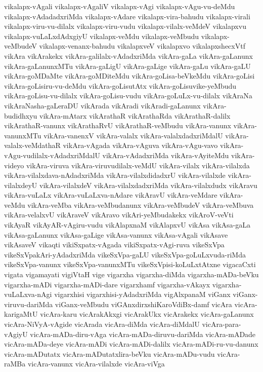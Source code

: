 {vikalapx-vAgali
vikalapx-vAgaliV
vikalapx-vAgi
vikalapx-vAgu-vu-deMdu
vikalapx-vAdadadxriMda
vikalapx-vAdare
vikalapx-vira-bahudu
vikalapx-virali
vikalapx-viru-vu-dilalx
vikalapx-viru-vudu
vikalapx-vilalx-veMdeV
vikalapxvu
vikalapx-vuLaLxdAdxgiyU
vikalapx-veMdu
vikalapx-veMbudu
vikalapx-veMbudeV
vikalapx-venanx-bahudu
vikalapxveV
vikalapxvo
vikalapxshecxVtf
vikAra
vikArakekx
vikAra-galilalx-vAdadxriMda
vikAra-gaLa
vikAra-gaLanunx
vikAra-gaLanunxMTu
vikAra-gaLigU
vikAra-gaLige
vikAra-gaLu
vikAra-gaLU
vikAra-goMDaMte
vikAra-goMDiteMdu
vikAra-goLisa-beVkeMdu
vikAra-goLisi
vikAra-goLisiru-vu-deMdu
vikAra-goLisutAtx
vikAra-goLisuvike-yeMbudu
vikAra-goLisu-vu-dilalx
vikAra-goLisu-vudu
vikAra-goLuLx-vu-dilalx
vikAraNa
vikAraNasha-gaLeraDU
vikArada
vikAradi
vikAradi-gaLanunx
vikAra-budidhxyu
vikAra-mAtarx
vikArathaR
vikArathaRda
vikArathaR-dalilx
vikArathaR-vanunx
vikArathaRvU
vikArathaR-veMbudu
vikAra-vanunx
vikAra-vanunxMTu
vikAra-vanenxV
vikAra-valalx
vikAra-valalxdadxriMdalU
vikAra-valalx-veMdathaR
vikAra-vAgada
vikAra-vAguva
vikAra-vAgu-vavo
vikAra-vAgu-vudilalx-vAdadxriMdalU
vikAra-vAdadxriMda
vikAra-vAyiteMdu
vikAra-videyo
vikAra-viruva
vikAra-viruvudilalx-veMdU
vikAra-vilalx
vikAra-vilalxda
vikAra-vilalxdava-nAdadxriMda
vikAra-vilalxdidadxrU
vikAra-vilalxde
vikAra-vilalxdeyU
vikAra-vilalxdeV
vikAra-vilalxdadxriMda
vikAra-vilalxdudx
vikAravu
vikAra-vuLaLx
vikAra-vuLaLxva-nAdare
vikAravU
vikAra-veMdare
vikAra-veMdu
vikAra-veMba
vikAra-veMbudanunx
vikAra-veMbudeV
vikAra-veMbuva
vikAra-velalxvU
vikAraveV
vikAravo
vikAri-yeMbudakekx
vikAroV-veVti
vikAyaR
vikAyAR-vAgiru-vudu
vikAlapxnaM
vikAlapxvU
vikAsa
vikAsa-gaLa
vikAsa-gaLanunx
vikAsa-gaLige
vikAsa-vanunx
vikAsa-vAgali
vikAsave
vikAsaveV
vikaqti
vikiSxpatx-vAgada
vikiSxpatx-vAgi-ruva
vikeSxVpa
vikeSxVpakAri-yAdadxriMda
vikeSxVpa-gaLU
vikeSxVpa-goLuLxvuda-riMda
vikeSxVpa-vanunx
vikeSxVpa-vanunxMTu
vikeSxVpisi-koLuLxtAtxne
vigacaCxti
vigata
vigamayati
vigiVtaH
vige
vigarxha
vigarxha-diMda
vigarxha-mADa-beVku
vigarxha-mADi
vigarxha-mADi-dare
vigarxhamf
vigarxha-vAkayx
vigarxha-vuLaLxva-nAgi
vigarxhisi
vigarxhisi-yAdadxriMda
vigAlxpanaM
viGanx
viGanx-viruvu-dariMda
viGanx-veMbudu
viGAnxdirxshiKaroVdiBx-damf
vicAra
vicAra-karigaMtU
vicAra-karu
vicArakAkxgi
vicArakUkx
vicArakekx
vicAra-gaLanunx
vicAra-NiVyA-vAgide
vicArada
vicAra-diMda
vicAra-diMdalU
vicAra-para-vAgiyU
vicAra-mADa-diru-vAga
vicAra-mADa-diruvu-dariMda
vicAra-mADade
vicAra-mADa-deye
vicAra-mADi
vicAra-mADi-dalilx
vicAra-mADi-ru-vu-danunx
vicAra-mADutatx
vicAra-mADutatxlira-beVku
vicAra-mADu-vudu
vicAra-raMBa
vicAra-vanunx
vicAra-vilalxde
vicAra-viVga
}
